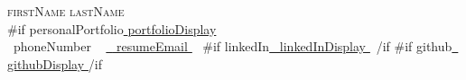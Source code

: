 \documentclass[letterpaper,11pt]{article}
\begin{document}

\begin{center}
    {\Huge \scshape {{firstName}} {{lastName}} } \\ \vspace{1pt}
    {{#if personalPortfolio}}\href{ {{personalPortfolio}} }{ {{portfolioDisplay}} }\\ 
    \small \raisebox{-0.1\height}\faPhone\ {{phoneNumber}} ~ \href{mailto:{{resumeEmail}} }{\raisebox{-0.2\height}\faEnvelope\  \underline{ {{resumeEmail}} } } ~ 
    {{#if linkedIn}}\href{ {{linkedIn}} }{\raisebox{-0.2\height}\faLinkedin\ \underline{ {{linkedInDisplay}} } }  ~{{/if}}
    {{#if github}}\href{ {{github}} }{\raisebox{-0.2\height}\faGithub\ \underline{ {{githubDisplay}} } }{{/if}}
    \vspace{-8pt}
\end{center}

\end{document}
